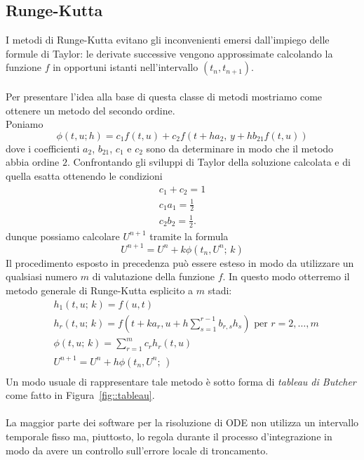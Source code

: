 \subsection{Runge-Kutta}
I metodi di Runge-Kutta evitano gli inconvenienti emersi dall'impiego delle formule di Taylor: le derivate successive vengono  approssimate calcolando la funzione $f$ in  opportuni istanti  nell'intervallo $\left(t_n , t_{n+1}\right)$.\\ \\
Per presentare l'idea alla base di questa classe di metodi mostriamo come ottenere un metodo del secondo ordine.\\
Poniamo 
$$ \phi(t,u;h) = c_1 f(t,u) + c_2 f\left(t+ ha_2, \, y + hb_{21}f(t,u)\right)$$
dove i coefficienti $a_2$, $b_{21}$, $c_1$ e $c_2$ sono da determinare in modo che il metodo abbia ordine $2$.  Confrontando gli sviluppi di Taylor della soluzione calcolata e di quella esatta ottenendo le condizioni 
\begin{equation}
\begin{aligned}
c_1 + c_2 = 1\\
c_1a_1= \frac{1}{2}\\
c_2b_2 = \frac{1}{2}	.
\end{aligned}
\end{equation}
dunque possiamo calcolare $U^{n+1}$ tramite la formula
$$ U^{n+1} = U^n + k \phi\left(t_n,U^n;\,k\right)$$
Il procedimento esposto  in precedenza pu\`o essere esteso in modo da utilizzare un qualsiasi numero $m$ di valutazione della funzione $f$.  In questo modo otterremo il metodo generale di Runge-Kutta esplicito a $m$ stadi:
\begin{equation}
\begin{aligned}
&h_1(t,u;\,k) = f(u,t) \\
&h_r(t,u;\,k) = f\left( t + k a_r, u + h \sum_{s=1}^{r-1} b_{r,s} h_s\right) \text{ per } r = 2, \dots, m \\
&\phi\left( t, u;\,k\right) = \sum_{r=1}^m c_r h_r(t,u)\\
&U^{n+1}= U^n + h \phi\left( t_n, U^n;\,\right)\\
\end{aligned}
\end{equation}
Un modo usuale di rappresentare tale metodo \`e sotto forma di \textit{tableau di Butcher} come fatto in Figura~\ref{fig::tableau}.\\ \\
La maggior parte dei software per la risoluzione di ODE non utilizza un intervallo temporale fisso ma, piuttosto, lo regola durante il processo d'integrazione in modo da avere un controllo sull'errore locale di troncamento.\\
